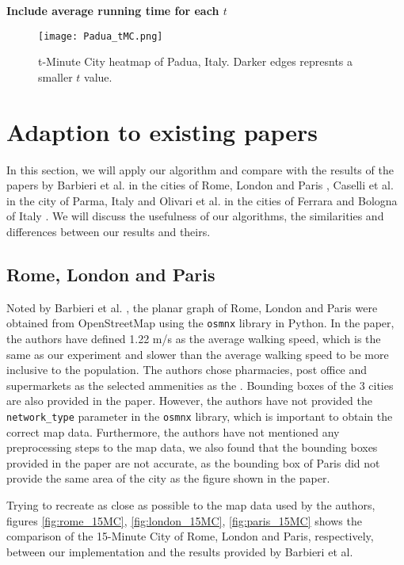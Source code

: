 \textbf{Include average running time for each $t$}

\begin{figure}[htbp]
    \centering
    \texttt{[image: Padua\_tMC.png]}
    \caption{t-Minute City heatmap of Padua, Italy. Darker edges represnts a smaller $t$ value.}
    \label{fig:padua_tMC}
\end{figure}

\section{Adaption to existing papers}

In this section, we will apply our algorithm and compare with the results of the papers by Barbieri et al. in the cities of Rome, London and Paris \cite{barbieri_graph_2023}, Caselli et al. in the city of Parma, Italy \cite{caselli_exploring_2022} and Olivari et al. in the cities of Ferrara and Bologna of Italy \cite{olivari_are_2023}. We will discuss the usefulness of our algorithms, the similarities and differences between our results and theirs.

\subsection{Rome, London and Paris}

Noted by Barbieri et al. \cite{barbieri_graph_2023}, the planar graph of Rome, London and Paris were obtained from OpenStreetMap using the \verb|osmnx| library in Python. In the paper, the authors have defined 1.22 m/s as the average walking speed, which is the same as our experiment and slower than the average walking speed to be more inclusive to the population. The authors chose pharmacies, post office and supermarkets as the selected ammenities as the . Bounding boxes of the 3 cities are also provided in the paper. However, the authors have not provided the \verb|network_type| parameter in the \verb|osmnx| library, which is important to obtain the correct map data. Furthermore, the authors have not mentioned any preprocessing steps to the map data, we also found that the bounding boxes provided in the paper are not accurate, as the bounding box of Paris did not provide the same area of the city as the figure shown in the paper.

Trying to recreate as close as possible to the map data used by the authors, figures \ref{fig:rome_15MC}, \ref{fig:london_15MC}, \ref{fig:paris_15MC} shows the comparison of the 15-Minute City of Rome, London and Paris, respectively, between our implementation and the results provided by Barbieri et al.

